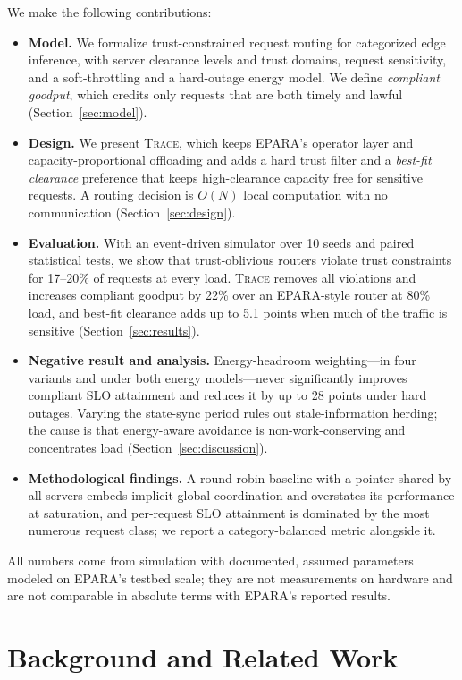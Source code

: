 \documentclass[journal]{IEEEtran}
\newcommand{\sys}{\textsc{Trace}}
\begin{document}
We make the following contributions:
\begin{itemize}
\item \textbf{Model.} We formalize trust-constrained request routing for categorized edge inference, with server clearance levels and trust domains, request sensitivity, and a soft-throttling and a hard-outage energy model. We define \emph{compliant goodput}, which credits only requests that are both timely and lawful (Section~\ref{sec:model}).
\item \textbf{Design.} We present \sys{}, which keeps EPARA's operator layer and capacity-proportional offloading and adds a hard trust filter and a \emph{best-fit clearance} preference that keeps high-clearance capacity free for sensitive requests. A routing decision is $O(N)$ local computation with no communication (Section~\ref{sec:design}).
\item \textbf{Evaluation.} With an event-driven simulator over 10 seeds and paired statistical tests, we show that trust-oblivious routers violate trust constraints for 17--20\% of requests at every load. \sys{} removes all violations and increases compliant goodput by 22\% over an EPARA-style router at 80\% load, and best-fit clearance adds up to 5.1 points when much of the traffic is sensitive (Section~\ref{sec:results}).
\item \textbf{Negative result and analysis.} Energy-headroom weighting---in four variants and under both energy models---never significantly improves compliant SLO attainment and reduces it by up to 28 points under hard outages. Varying the state-sync period rules out stale-information herding; the cause is that energy-aware avoidance is non-work-conserving and concentrates load (Section~\ref{sec:discussion}).
\item \textbf{Methodological findings.} A round-robin baseline with a pointer shared by all servers embeds implicit global coordination and overstates its performance at saturation, and per-request SLO attainment is dominated by the most numerous request class; we report a category-balanced metric alongside it.
\end{itemize}

All numbers come from simulation with documented, assumed parameters modeled on EPARA's testbed scale; they are not measurements on hardware and are not comparable in absolute terms with EPARA's reported results.

\section{Background and Related Work}\label{sec:related}
\end{document}

